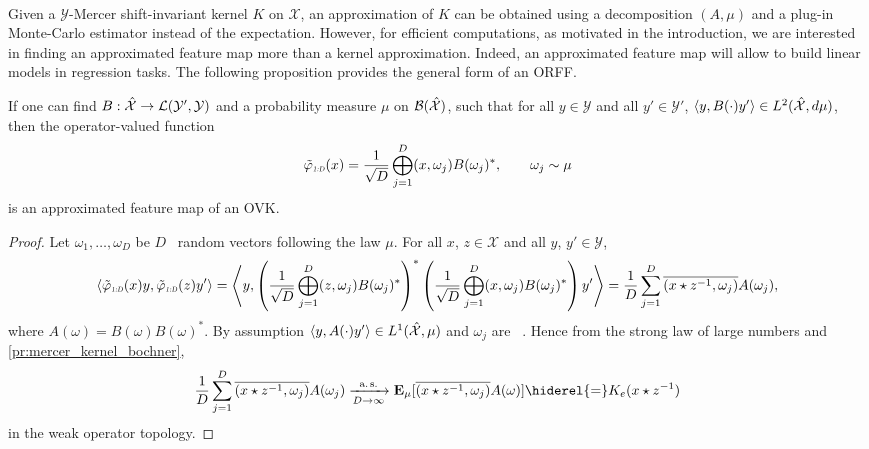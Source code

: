 \paragraph{}
Given a $\mathcal{Y}$-Mercer shift-invariant kernel $K$ on $\mathcal{X}$, an approximation of $K$ can be obtained using a decomposition $(A, \mu)$ and a plug-in Monte-Carlo estimator instead of the expectation. However, for efficient computations, as motivated in the introduction, we are interested in finding an approximated feature map more than a kernel approximation. Indeed, an approximated feature map will allow to build linear models in regression tasks. The following proposition provides the general form of an \acl{ORFF}.
\begin{proposition}\label{pr:ORFF-map}If one can find $B: \hat{\mathcal{X}} \to \mathcal{L}(\mathcal{Y}',\mathcal{Y})$ and a probability measure $\mu$ on $\mathcal{B}(\hat{\mathcal{X}})$, such that for all $y\in\mathcal{Y}$ and all $y'\in\mathcal{Y}'$, $\langle y, B(\cdot)y'\rangle \in L^2(\hat{\mathcal{X}}, d\mu)$, then the operator-valued function
\begin{equation}\label{eq:phitilde}
\tildePhi{1:D}(x)= \frac{1}{\sqrt{D}}\Vect_{j=1}^D\pairing{x, \omega_j}B(\omega_j)^*, \qquad \omega_j \sim \mu
\end{equation}
is an approximated feature map of an \acl{OVK}.
\end{proposition}
\begin{proof}
Let $\omega_1, \ldots, \omega_D$ be $D$ \iid~random vectors following the law $\mu$. For all $x$, $z \in \mathcal{X}$ and all $y$, $y' \in \mathcal{Y}$, 
\begin{dmath*}
\inner*{\tildePhi{1:D}(x)y,\tildePhi{1:D}(z)y'}=\inner*{y,\left(\frac{1}{\sqrt{D}}\Vect_{j=1}^D\pairing{z, \omega_j}B(\omega_j)^*\right)^* \left(\frac{1}{\sqrt{D}}\Vect_{j=1}^D\pairing{x, \omega_j}B(\omega_j)^*\right)y'}
= \frac{1}{D} \sum_{j=1}^D \conj{\pairing{x\groupop \inv{z}, \omega_j}}A(\omega_j),
\end{dmath*}
where $A(\omega)=B(\omega)B(\omega)^*$. By assumption $\langle y, A(\cdot)y'\rangle\in L^1(\hat{\mathcal{X}},\mu)$ and $\omega_j$ are \iid~. Hence from the strong law of large numbers and \cref{pr:mercer_kernel_bochner}, 
\begin{dmath*}
\frac{1}{D} \sum_{j=1}^D \conj{\pairing{x\groupop\inv{z},\omega_j}}A(\omega_j)\converges{\asurely}{D\to\infty}\expectation_{\mu}[\conj{\pairing{x\groupop z^{-1},\omega_j}}A(\omega)]\hiderel{=}K_e(x\groupop\inv{z})
\end{dmath*}
in the weak operator topology.
\end{proof}

